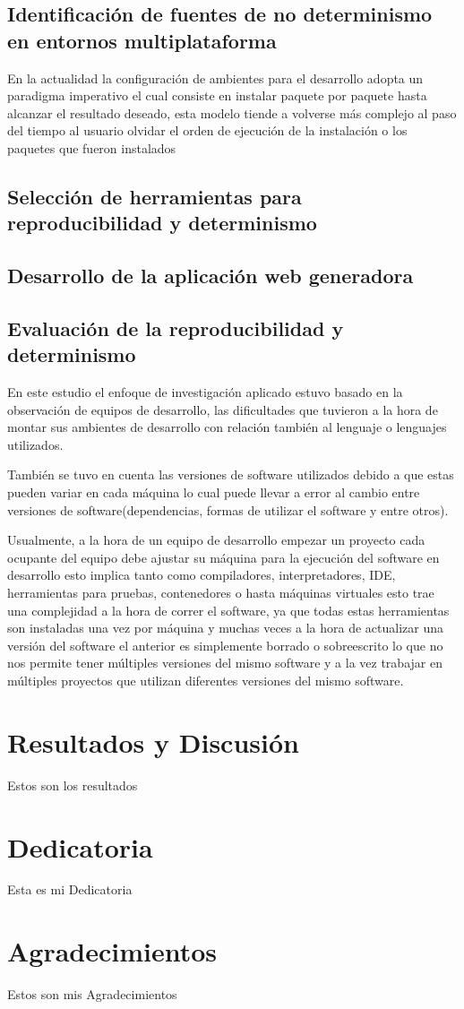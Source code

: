 \documentclass[stu,]{apa7} %
\begin{document}
\subsection{Identificación de fuentes de no determinismo en entornos multiplataforma}

En la actualidad la configuración de ambientes para el desarrollo adopta un paradigma imperativo el cual consiste en instalar paquete por paquete hasta alcanzar el resultado deseado, esta modelo tiende a volverse más complejo al paso del tiempo al usuario olvidar el orden de ejecución de la instalación o los paquetes que fueron instalados    


\subsection{Selección de herramientas para reproducibilidad y determinismo}

\subsection{Desarrollo de la aplicación web generadora}

\subsection{Evaluación de la reproducibilidad y determinismo}

En este estudio el enfoque de investigación aplicado estuvo basado en la observación de equipos de desarrollo, las dificultades que tuvieron a la hora de montar sus ambientes de desarrollo con relación también al lenguaje o  lenguajes utilizados.

También se tuvo en cuenta las versiones de software utilizados debido a que estas pueden variar en cada máquina lo cual puede llevar a error al cambio entre versiones de software(dependencias, formas de utilizar el software y entre otros).

Usualmente, a la hora de un equipo de desarrollo empezar un proyecto cada ocupante del equipo debe ajustar su máquina para la ejecución del software en desarrollo esto implica tanto como compiladores, interpretadores, IDE, herramientas para pruebas, contenedores o hasta máquinas virtuales esto trae una complejidad a la hora de correr el software, ya que todas estas herramientas son instaladas una vez por máquina y muchas veces a la hora de actualizar una versión del software el anterior es simplemente borrado o sobreescrito lo que no nos permite tener múltiples versiones del mismo software y a la vez trabajar en múltiples proyectos que utilizan diferentes versiones del mismo software.

\section{Resultados y Discusión}

Estos son los resultados

\section{Dedicatoria}
Esta es mi Dedicatoria

\section{Agradecimientos}
Estos son mis Agradecimientos

\printbibliography
\end{document}
